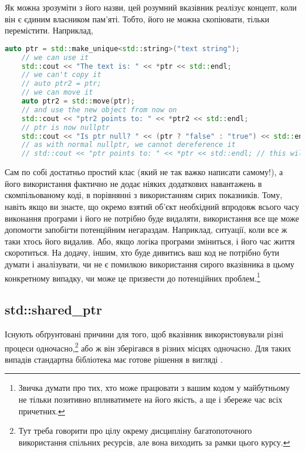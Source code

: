 \documentclass[12pt]{article}
\begin{document}
    Як можна зрозуміти з його назви, цей розумний вказівник реалізує концепт, коли він є єдиним власником пам'яті. Тобто, його не можна скопіювати, тільки перемістити. Наприклад,
    \begin{lstlisting}[language=c++]
    auto ptr = std::make_unique<std::string>("text string");
    // we can use it
    std::cout << "The text is: " << *ptr << std::endl;
    // we can't copy it
    // auto ptr2 = ptr;
    // we can move it
    auto ptr2 = std::move(ptr);
    // and use the new object from now on
    std::cout << "ptr2 points to: " << *ptr2 << std::endl;
    // ptr is now nullptr
    std::cout << "Is ptr null? " << (ptr ? "false" : "true") << std::endl;
    // as with normal nullptr, we cannot dereference it
    // std::cout << "ptr points to: " << *ptr << std::endl; // this will crash
    \end{lstlisting}

    Сам по собі  достатньо простий клас (який не так важко написати самому!), а його використання фактично не додає ніяких додаткових навантажень в скомпільованому коді, в порівнянні з використанням сирих показників. Тому, навіть якщо ви знаєте, що окремо взятий об'єкт необхідний впродовж всього часу виконання програми і його не потрібно буде видаляти, використання  все ще може допомогти запобігти потенційним негараздам. Наприклад, ситуації, коли все ж таки хтось його видалив. Або, якщо логіка програми зміниться, і його час життя скоротиться. На додачу, іншим, хто буде дивитись ваш код не потрібно бути думати і аналізувати, чи не є помилкою використання сирого вказівника в цьому конкретному випадку, чи може це призвести до потенційних проблем.\footnote{Звичка думати про тих, хто може працювати з вашим кодом у майбутньому не тільки позитивно впливатимете на його якість, а ще і збереже час всіх причетних.}



    \subsection{std::shared\_ptr}
    Існують обґрунтовані причини для того, щоб вказівник використовували різні процеси одночасно,\footnote{Тут треба говорити про цілу окрему дисципліну багатопоточного використання спільних ресурсів, але вона виходить за рамки цього курсу.} або ж він зберігався в різних місцях одночасно. Для таких випадів стандартна бібліотека має готове рішення в вигляді . 
    
\end{document}
